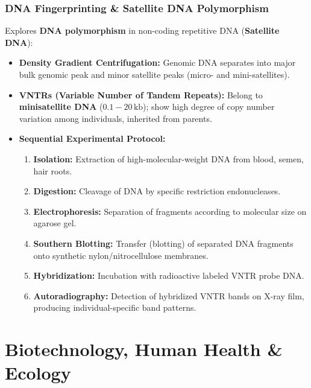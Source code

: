 \documentclass[10pt,twoside,openright]{book}
\begin{document}
\section{DNA Fingerprinting \& Satellite DNA Polymorphism}

\begin{conceptbox}
Explores \textbf{DNA polymorphism} in non-coding repetitive DNA (\textbf{Satellite DNA}):
\begin{itemize}[leftmargin=*]
  \item \textbf{Density Gradient Centrifugation:} Genomic DNA separates into major bulk genomic peak and minor satellite peaks (micro- and mini-satellites).
  \item \textbf{VNTRs (Variable Number of Tandem Repeats):} Belong to \textbf{minisatellite DNA} ($0.1-20\,\mathrm{kb}$); show high degree of copy number variation among individuals, inherited from parents.
  \item \textbf{Sequential Experimental Protocol:}
  \begin{enumerate}
    \item \textbf{Isolation:} Extraction of high-molecular-weight DNA from blood, semen, hair roots.
    \item \textbf{Digestion:} Cleavage of DNA by specific restriction endonucleases.
    \item \textbf{Electrophoresis:} Separation of fragments according to molecular size on agarose gel.
    \item \textbf{Southern Blotting:} Transfer (blotting) of separated DNA fragments onto synthetic nylon/nitrocellulose membranes.
    \item \textbf{Hybridization:} Incubation with radioactive labeled VNTR probe DNA.
    \item \textbf{Autoradiography:} Detection of hybridized VNTR bands on X-ray film, producing individual-specific band patterns.
  \end{enumerate}
\end{itemize}
\end{conceptbox}


\part{Biotechnology, Human Health \& Ecology}
\end{document}
